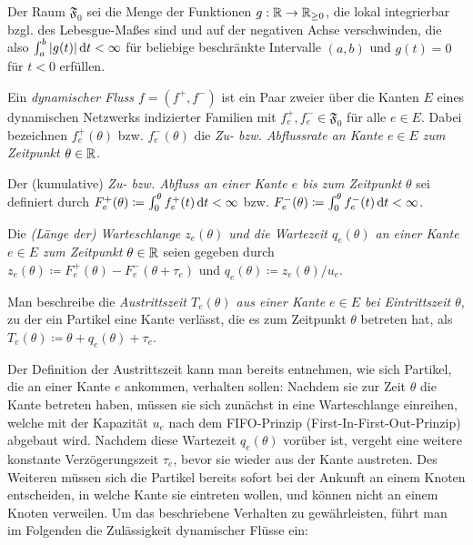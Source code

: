 \begin{definition}
	Der Raum $\mathfrak{F}_0$ sei die Menge der Funktionen $g: \mathbb{R} \to \mathbb{R}_{\geq 0}$, die lokal integrierbar bzgl. des Lebesgue-Maßes sind und auf der negativen Achse verschwinden, die also $\int_a^b |g(t)| \mathop{}\!\mathrm{d} t< \infty$ für beliebige beschränkte Intervalle $(a,b)$ und $g(t)=0$ für $t<0$ erfüllen.
\end{definition}

\begin{definition}
	Ein \emph{dynamischer Fluss $f=(f^+, f^-)$} ist ein Paar zweier über die Kanten $E$ eines dynamischen Netzwerks indizierter Familien mit $f^+_e,f^-_e\in\mathfrak F_0$ für alle $e\in E$.
	Dabei bezeichnen $f_e^+(\theta)$ bzw. $f_e^-(\theta)$ die \emph{Zu- bzw. Abflussrate an Kante $e\in E$ zum Zeitpunkt $\theta\in\mathbb{R}$}.
	
	Der (kumulative) \emph{Zu- bzw. Abfluss an einer Kante $e$ bis zum Zeitpunkt $\theta$} sei definiert durch $F^+_e(\theta)\coloneq\int_0^\theta f^+_e(t) \mathop{}\!\mathrm{d} t<\infty$ bzw. $F^-_e(\theta)\coloneq\int_0^\theta f^-_e(t) \mathop{}\!\mathrm{d} t<\infty$.
	
	Die \emph{(Länge der) Warteschlange $z_e(\theta)$ und die Wartezeit $q_e(\theta)$ an einer Kante $e\in E$ zum Zeitpunkt $\theta\in\mathbb{R}$} seien gegeben durch $z_e(\theta)\coloneq F_e^+(\theta) - F_e^-(\theta + \tau_e)$ und $q_e(\theta) \coloneq z_e(\theta) / u_e$.
	
	Man beschreibe die \emph{Austrittszeit $T_e(\theta)$ aus einer Kante $e\in E$ bei Eintrittszeit $\theta$}, zu der ein Partikel eine Kante verlässt, die es zum Zeitpunkt $\theta$ betreten hat, als $T_e(\theta)\coloneq\theta + q_e(\theta) + \tau_e$.
\end{definition}

Der Definition der Austrittszeit kann man bereits entnehmen, wie sich Partikel, die an einer Kante $e$ ankommen, verhalten sollen:
Nachdem sie zur Zeit $\theta$ die Kante betreten haben, müssen sie sich zunächst in eine Warteschlange einreihen, welche mit der Kapazität $u_e$ nach dem FIFO-Prinzip (First-In-First-Out-Prinzip) abgebaut wird.
Nachdem diese Wartezeit $q_e(\theta)$ vorüber ist, vergeht eine weitere konstante Verzögerungszeit $\tau_e$, bevor sie wieder aus der Kante austreten.
Des Weiteren müssen sich die Partikel bereits sofort bei der Ankunft an einem Knoten entscheiden, in welche Kante sie eintreten wollen, und können nicht an einem Knoten verweilen.
Um das beschriebene Verhalten zu gewährleisten, führt man im Folgenden die Zulässigkeit dynamischer Flüsse ein:

